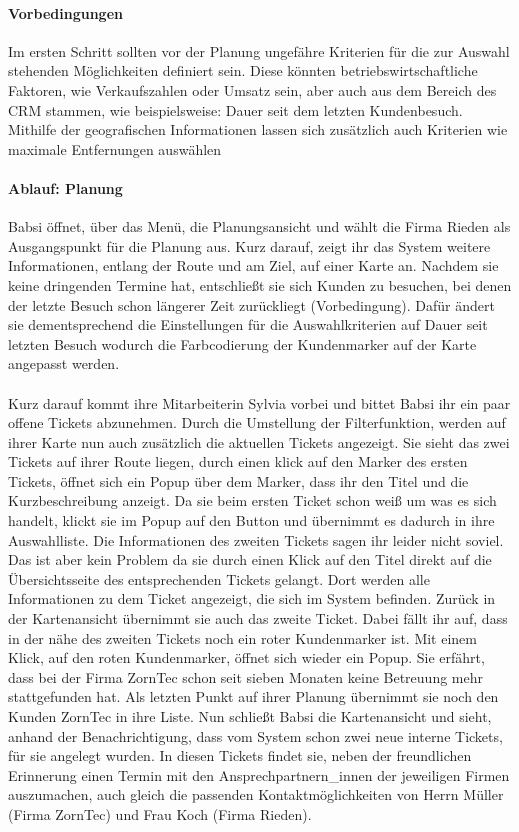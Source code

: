 \documentclass[Bachelorarbeit.tex]{subfiles}
\begin{document}
\paragraph*{Vorbedingungen}
Im ersten Schritt sollten vor der Planung ungefähre Kriterien für die zur Auswahl stehenden Möglichkeiten definiert sein.
Diese könnten betriebswirtschaftliche Faktoren, wie Verkaufszahlen oder Umsatz sein, aber auch aus dem Bereich des \ac{CRM} stammen, wie beispielsweise: Dauer seit dem letzten Kundenbesuch.
Mithilfe der geografischen Informationen lassen sich zusätzlich auch Kriterien wie maximale Entfernungen auswählen

\paragraph*{Ablauf: Planung}
Babsi öffnet, über das Menü, die Planungsansicht und wählt die Firma Rieden als Ausgangspunkt für die Planung aus.
Kurz darauf, zeigt ihr das System weitere Informationen, entlang der Route und am Ziel, auf einer Karte an.
Nachdem sie keine dringenden Termine hat, entschließt sie sich Kunden zu besuchen, bei denen der letzte Besuch schon längerer Zeit zurückliegt (Vorbedingung).
Dafür ändert sie dementsprechend die Einstellungen für die Auswahlkriterien auf Dauer seit letzten Besuch wodurch die Farbcodierung der Kundenmarker auf der Karte angepasst werden.\\
\\
Kurz darauf kommt ihre Mitarbeiterin Sylvia vorbei und bittet Babsi ihr ein paar offene Tickets abzunehmen. 
Durch die Umstellung der Filterfunktion, werden auf ihrer Karte nun auch zusätzlich die aktuellen Tickets angezeigt.
Sie sieht das zwei Tickets auf ihrer Route liegen, durch einen klick auf den Marker des ersten Tickets, öffnet sich ein Popup über dem Marker, dass ihr den Titel und die Kurzbeschreibung anzeigt. 
Da sie beim ersten Ticket schon weiß um was es sich handelt, klickt sie im Popup auf den Button und übernimmt es dadurch in ihre Auswahlliste.
Die Informationen des zweiten Tickets sagen ihr leider nicht soviel. 
Das ist aber kein Problem da sie durch einen Klick auf den Titel direkt auf die Übersichtsseite des entsprechenden Tickets gelangt.
Dort werden alle Informationen zu dem Ticket angezeigt, die sich im System befinden.
Zurück in der Kartenansicht übernimmt sie auch das zweite Ticket. 
Dabei fällt ihr auf, dass in der nähe des zweiten Tickets noch ein roter Kundenmarker ist.
Mit einem Klick, auf den roten Kundenmarker, öffnet sich wieder ein Popup.
Sie erfährt, dass bei der Firma ZornTec schon seit sieben Monaten keine Betreuung mehr stattgefunden hat.
Als letzten Punkt auf ihrer Planung übernimmt sie noch den Kunden ZornTec in ihre Liste. 
Nun schließt Babsi die Kartenansicht und sieht, anhand der Benachrichtigung, dass vom System schon zwei neue interne Tickets, für sie angelegt wurden.
In diesen Tickets findet sie, neben der freundlichen Erinnerung einen Termin mit den Ansprechpartnern\_innen der jeweiligen Firmen auszumachen, auch gleich die passenden Kontaktmöglichkeiten von Herrn Müller (Firma ZornTec) und Frau Koch (Firma Rieden).
\end{document}
